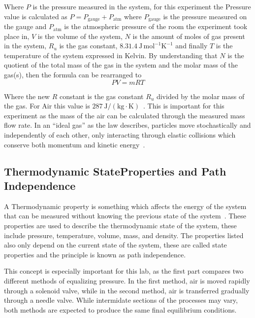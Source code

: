 \documentclass[12pt,letterpaper]{article}
\begin{document}
Where $P$ is the pressure measured in the system, for this
experiment the Pressure value is calculated as
$P = P_{\mathrm{gauge}} + P_{\mathrm{atm}}$ where
$P_{\mathrm{gauge}}$ is the pressure measured on the gauge
and $P_{\mathrm{atm}}$ is the atmospheric pressure of the
room the experiment took place in, $V$ is the volume of the
system, $N$ is the amount of moles of gas present in the
system, $R_u$ is the gas constant,
$8.31.4~\mathrm{J\,mol^{-1}K^{-1}}$ and finally $T$
is the temperature of the system expressed in Kelvin.
By understanding that $N$ is the quotient of the total mass
of the gas in the system and the molar mass of the gas(s),
then the formula can be rearranged to
\begin{equation}
    PV = mRT
\end{equation}

Where the new $R$ constant is the gas constant $R_u$
divided by the molar mass of the gas. For Air this value
is $287~\mathrm{J/(kg\cdot K)}$~\cite{kleeman1928}. This is important for
this experiment as the mass of the air can be calculated
through the measured mass flow rate. In an ``ideal gas''
as the law describes, particles move stochastically and
independently of each other, only interacting through
elastic collisions which conserve both momentum and
kinetic energy~\cite{luder1968}.

\subsection[Thermodynamic State Properties and Path Independence]{Thermodynamic State\newline Properties and Path Independence}

A Thermodynamic property is something which affects the
energy of the system that can be measured without knowing
the previous state of the system~\cite{chandra2016}. These properties
are used to describe the thermodynamic state of the system,
these include pressure, temperature, volume, mass, and
density. The properties listed also only depend on the
current state of the system, these are called state
properties and the principle is known as path independence.

This concept is especially important for this lab, as
the first part compares two different methods of equalizing
pressure. In the first method, air is moved rapidly through a solenoid valve,
while in the second method, air is transferred gradually
through a needle valve. While intermidate sections of the processes
may vary, both methods are expected to produce the same final equilibrium
conditions.
\end{document}
